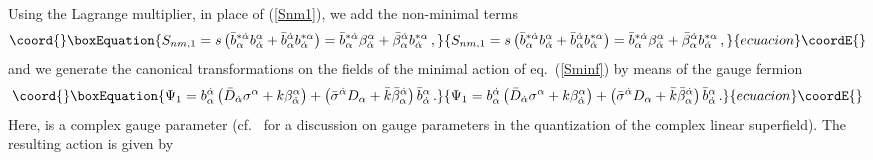 \documentclass[a4paper,12pt]{article}
\begin{document}
Using the Lagrange multiplier, in place of (\ref{Snm1}), we add the
non-minimal terms
\begin{equation}\coord{}\boxEquation{
S_{nm,1}= s \left(  \bar b^{*\dot \alpha}_\alpha b^{\alpha}_{\dot \alpha} + 
\bar b^{\dot \alpha}_\alpha    b^{*\alpha}_{\dot \alpha}
\right) = \bar b^{*\dot \alpha}_\alpha \beta^{\alpha}_{\dot \alpha}  +  
\bar \beta^{\dot \alpha}_\alpha    b^{*\alpha}_{\dot \alpha}\,,  \label{nm1}
}{
S_{nm,1}= s \left(  \bar b^{*\dot \alpha}_\alpha b^{\alpha}_{\dot \alpha} + 
\bar b^{\dot \alpha}_\alpha    b^{*\alpha}_{\dot \alpha}
\right) = \bar b^{*\dot \alpha}_\alpha \beta^{\alpha}_{\dot \alpha}  +  
\bar \beta^{\dot \alpha}_\alpha    b^{*\alpha}_{\dot \alpha}\,,  }{ecuacion}\coordE{}\end{equation}
and we generate the canonical transformations on the fields of the
minimal action \coordHE{} of eq.~(\ref{Sminf}) by means of the gauge
fermion
\begin{equation}\coord{}\boxEquation{
\Psi_1= 
b_\alpha^{\dot \alpha} 
\left( \bar D_{\dot \alpha}\sigma^\alpha + k \beta^{\alpha}_{\dot
    \alpha} \right)  + 
\left( \bar \sigma^{\dot \alpha} 
 D_\alpha  + \bar k \bar \beta^{\dot
    \alpha}_\alpha \right) \bar b_{\dot \alpha}^\alpha \,. 
\label{Psi1_new}
}{
\Psi_1= 
b_\alpha^{\dot \alpha} 
\left( \bar D_{\dot \alpha}\sigma^\alpha + k \beta^{\alpha}_{\dot
    \alpha} \right)  + 
\left( \bar \sigma^{\dot \alpha} 
 D_\alpha  + \bar k \bar \beta^{\dot
    \alpha}_\alpha \right) \bar b_{\dot \alpha}^\alpha \,. 
}{ecuacion}\coordE{}\end{equation}
Here, \coordHE{} is a complex gauge parameter (cf.~\cite{GPZ} for a
discussion on gauge parameters in the quantization of the complex
linear superfield). The resulting action is given by
\end{document}
